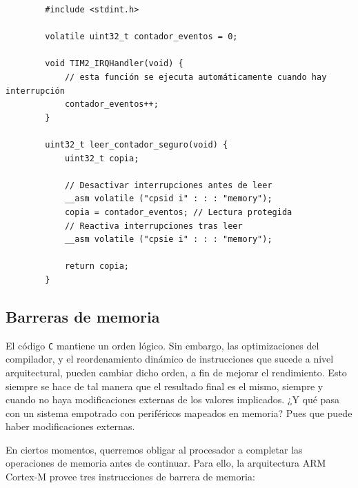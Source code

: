 \documentclass[../main.tex]{subfiles}
\begin{document}
    \begin{lstlisting}
        #include <stdint.h>

        volatile uint32_t contador_eventos = 0;

        void TIM2_IRQHandler(void) {
            // esta función se ejecuta automáticamente cuando hay interrupción
            contador_eventos++; 
        }

        uint32_t leer_contador_seguro(void) {
            uint32_t copia;

            // Desactivar interrupciones antes de leer
            __asm volatile ("cpsid i" : : : "memory");
            copia = contador_eventos; // Lectura protegida
            // Reactiva interrupciones tras leer
            __asm volatile ("cpsie i" : : : "memory");

            return copia;
        }
    \end{lstlisting}

    \subsection{Barreras de memoria}

        El código \texttt{C} mantiene un orden lógico. Sin embargo, las optimizaciones del compilador, y el reordenamiento dinámico de instrucciones que sucede a nivel arquitectural, pueden cambiar dicho orden, a fin de mejorar el rendimiento. Esto siempre se hace de tal manera que el resultado final es el mismo, siempre y cuando no haya modificaciones externas de los valores implicados. ¿Y qué pasa con un sistema empotrado con periféricos mapeados en memoria? Pues que puede haber modificaciones externas.

        En ciertos momentos, querremos obligar al procesador a completar las operaciones de memoria antes de continuar. Para ello, la arquitectura ARM Cortex-M provee tres instrucciones de barrera de memoria:
\end{document}
